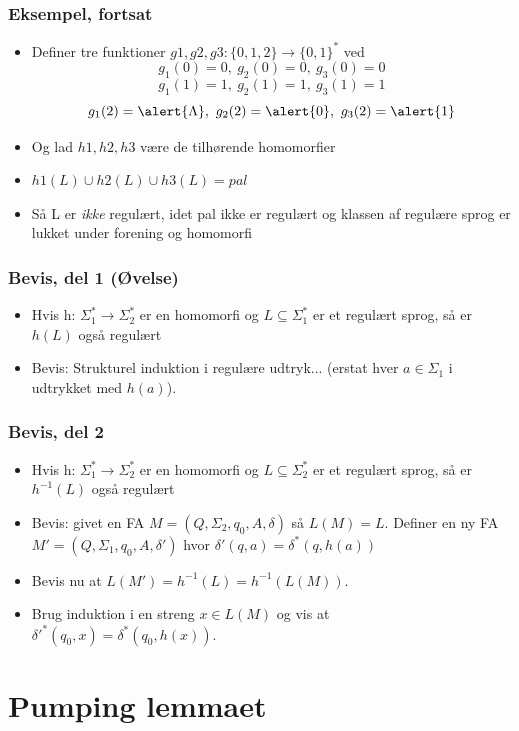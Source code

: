 \begin{frame}
\frametitle{Eksempel, fortsat}
\begin{itemize}[<+->]
\item  Definer tre funktioner  $g1,g2,g3:  \{0,1,2\}\rightarrow\{0,1\}^*$  ved 
\[g_1(0)=0,\ g_2(0)=0,\ g_3(0)=0 \]
\[g_1(1)=1,\ g_2(1)=1,\ g_3(1)=1 \]
\[g_1(2)=\alert{\Lambda},\ g_2(2)=\alert{0},\ g_3(2)=\alert{1} \]
\item  Og lad $h1,h2,h3$ være de tilhørende homomorfier 
\item  $h1(L) \cup h2(L) \cup h3(L) = pal$ 
\item  Så L er \emph{ikke} regulært, idet pal ikke er regulært og klassen  
af regulære sprog er lukket under forening og homomorfi
\end{itemize}
\end{frame}

\begin{frame}
\frametitle{Bevis, del 1 (Øvelse)}
\begin{itemize}[<+->]
\item Hvis h: $\Sigma_1^*\rightarrow\Sigma_2^*$ er en homomorfi og
  $L\subseteq\Sigma_1^*$ er et regulært sprog, så er $h(L)$ også regulært
  \item Bevis: Strukturel induktion i regulære udtryk...
    (erstat hver $a\in\Sigma_1$ i udtrykket med $h(a)$).
\end{itemize}
\end{frame}

\begin{frame}
\frametitle{Bevis, del 2}
\begin{itemize}[<+->]
\item Hvis h: $\Sigma_1^*\rightarrow\Sigma_2^*$ er en homomorfi og
  $L\subseteq\Sigma_2^*$ er et regulært sprog, så er $h^{-1}(L)$ også regulært
  \item Bevis: givet en FA $M=(Q, \Sigma_2, q_0, A, \delta)$ så $L(M)=L$.
    Definer en ny FA $M' = (Q, \Sigma_1, q_0, A, \delta ')$ hvor
    $\delta'(q,a) = \delta^*(q,h(a))$
  \item Bevis nu at $L(M')=h^{-1}(L)=h^{-1}(L(M))$.
  \item Brug induktion i en
    streng $x\in L(M)$ og vis at $\delta'^*(q_0,x) =
    \delta^*(q_0,h(x))$.
\end{itemize}
\end{frame}

\section{Pumping lemmaet}

